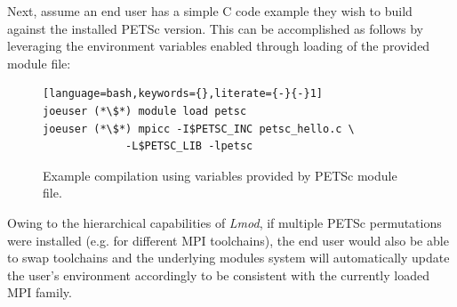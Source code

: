 \documentclass{sig-alternate-05-2015}
\begin{document}
\noindent
Next, assume an end user has a simple C code example they wish to build against
the installed PETSc version. This can be accomplished as follows by leveraging
the environment variables enabled through loading of the provided module file:

\begin{figure}[h]
\begin{lstlisting}[language=bash,keywords={},literate={-}{-}1]
joeuser (*\$*) module load petsc
joeuser (*\$*) mpicc -I$PETSC_INC petsc_hello.c \
             -L$PETSC_LIB -lpetsc
\end{lstlisting}
\vspace*{-0.3cm}
  \caption{Example compilation using variables provided by PETSc module file.}
    \label{fig:petsccompile}
\end{figure}

\newpage
Owing to the hierarchical capabilities of {\em Lmod}, if multiple PETSc
permutations were installed (e.g. for different MPI toolchains), the end user
would also be able to swap toolchains and the underlying modules system will
automatically update the user's environment accordingly to be consistent with
the currently loaded MPI family.



\end{document}
